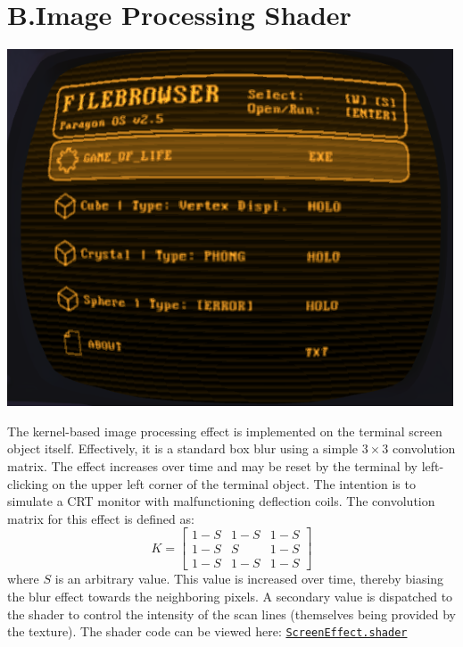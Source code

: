 \documentclass[11pt]{article}
\newcommand{\makesection}[2]{\newpage\section*{#1.\quad #2}}
\newcommand{\repolink}{https://github.com/malcolmriley/CMPM-163/blob/master/homework/Assets}
\newcommand{\shaderlink}[1]{\href{\repolink/Shaders/#1.shader}{\texttt{#1.shader}}}
\begin{document}
\makesection{B}{Image Processing Shader}
\begin{center}
	\includegraphics[width=0.5\linewidth]{screeneffect.png}
\end{center}
The kernel-based image processing effect is implemented on the terminal screen object itself. Effectively, it is a standard box blur using a simple $3 \times 3$ convolution matrix. The effect increases over time and may be reset by  the terminal by left-clicking on the upper left corner of the terminal object. The intention is to simulate a CRT monitor with malfunctioning deflection coils. The convolution matrix for this effect is defined as:
\[ K = \begin{bmatrix} 1-S & 1-S & 1-S \\ 1-S & S & 1-S \\ 1-S & 1-S & 1-S \end{bmatrix} \] where $S$ is an arbitrary  value. This value is increased over time, thereby biasing the blur effect towards the neighboring pixels. A secondary  value is dispatched to the shader to control the intensity of the scan lines (themselves being provided by the  texture). The shader code can be viewed here: \shaderlink{ScreenEffect}
\end{document}
